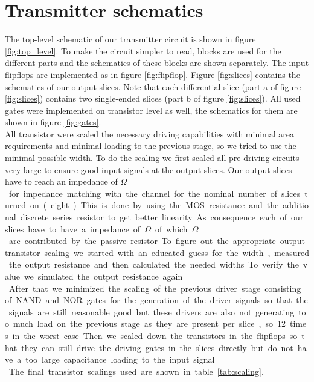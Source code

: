 \section{Transmitter schematics}

The top-level schematic of our transmitter circuit is shown in figure \ref{fig:top_level}. To make the circuit simpler to read, blocks are used for the different parts and the schematics of these blocks are shown separately. The input flipflops are implemented as in figure \ref{fig:flipflop}. Figure \ref{fig:slices} contains the schematics of our output slices. Note that each differential slice (part a of figure \ref{fig:slices}) contains two single-ended slices (part b of figure \ref{fig:slices}). All used gates were implemented on transistor level as well, the schematics for them are shown in figure \ref{fig:gates}.\\
All transistor were scaled the necessary driving capabilities with minimal area requirements and minimal loading to the previous stage, so we tried to use the minimal possible width. To do the scaling we first scaled all pre-driving circuits very large to ensure good input signals at the output slices. Our output slices have to reach an impedance of \unit[50]{$\Omega$} for impedance matching with the channel for the nominal number of slices turned on (eight). This is done by using the MOS resistance and the additional discrete series resistor to get better linearity. As consequence each of our slices have to have a impedance of \unit[400]{$\Omega$} of which \unit[300]{$\Omega$} are contributed by the passive resistor. To figure out the appropriate output transistor scaling we started with an educated guess for the width, measured the output resistance and then calculated the needed widths. To verify the value we simulated the output resistance again.\\
After that we minimized the scaling of the previous driver stage consisting of NAND and NOR gates for the generation of the driver signals so that the signals are still reasonable good but these drivers are also not generating too much load on the previous stage as they are present per slice, so 12 times in the worst case. Then we scaled down the transistors in the flipflops so that they can still drive the driving gates in the slices directly but do not have a too large capacitance loading to the input signal.\\
The final transistor scalings used are shown in table \ref{tab:scaling}.

